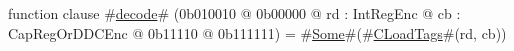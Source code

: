 function clause #\hyperref[sailMIPSzdecode]{decode}# (0b010010 @ 0b00000 @ rd : IntRegEnc @ cb : CapRegOrDDCEnc @    0b11110 @ 0b111111) = #\hyperref[sailMIPSzSome]{Some}#(#\hyperref[sailMIPSzCLoadTags]{CLoadTags}#(rd, cb))
